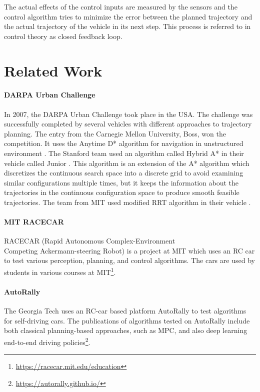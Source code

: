 The actual effects of the control inputs are measured by the sensors and the control algorithm tries to minimize the error between the planned trajectory and the actual trajectory of the vehicle in its next step. This process is referred to in control theory as closed feedback loop.

\section{Related Work}

\paragraph{DARPA Urban Challenge} In 2007, the DARPA Urban Challenge took place in the USA. The challenge was successfully completed by several vehicles with different approaches to trajectory planning. The entry from the Carnegie Mellon University, Boss, won the competition. It uses the Anytime D* algorithm for navigation in unstructured environment \cite{Boss}. The Stanford team used an algorithm called Hybrid A* in their vehicle called Junior \cite{Junior}. This algorithm is an extension of the A* algorithm which discretizes the continuous search space into a discrete grid to avoid examining similar configurations multiple times, but it keeps the information about the trajectories in the continuous configuration space to produce smooth feasible trajectories. The team from MIT used modified RRT algorithm in their vehicle \cite{RRT_urban_driving}.

\paragraph{MIT RACECAR} RACECAR (Rapid Autonomous Complex-Environment \\ Competing Ackermann-steering Robot) is a project at MIT which uses an RC car to test various perception, planning, and control algorithms. The cars are used by students in various courses at MIT\footnote{\url{https://racecar.mit.edu/education}}.

\paragraph{AutoRally} The Georgia Tech uses an RC-car based platform AutoRally to test algorithms for self-driving cars. The publications of algorithms tested on AutoRally include both classical planning-based approaches, such as MPC, and also deep learning end-to-end driving policies\footnote{\url{https://autorally.github.io/}}.


